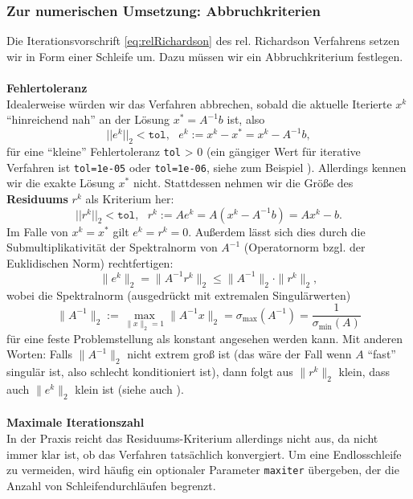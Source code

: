 \subsubsection{Zur numerischen Umsetzung: Abbruchkriterien}
Die Iterationsvorschrift \eqref{eq:relRichardson} des rel. Richardson Verfahrens setzen wir in Form einer Schleife um. Dazu müssen wir ein Abbruchkriterium festlegen.\\~\\
\textbf{Fehlertoleranz}\\
Idealerweise würden wir das Verfahren abbrechen, sobald die aktuelle Iterierte $x^k$ ``hinreichend nah'' an der Lösung $x^* = A^{-1}b$ ist, also
$$||e^k||_2 < \texttt{tol},~~~ e^k:= x^k - x^* = x^k - A^{-1}b,$$
für eine ``kleine'' Fehlertoleranz \texttt{tol} > 0 (ein gängiger Wert für iterative Verfahren ist \texttt{tol=1e-05} oder \texttt{tol=1e-06}, siehe zum Beispiel ). Allerdings kennen wir die exakte Lösung $x^*$ nicht. Stattdessen nehmen wir die Größe des \textbf{Residuums} $r^k$ als Kriterium her:
$$||r^k||_2 < \texttt{tol},~~~ r^k:= Ae^k= A(x^k - A^{-1}b)= Ax^k -b.$$
Im Falle von $x^k = x^*$ gilt $e^k = r^k = 0$. Außerdem lässt sich dies durch die Submultiplikativität der Spektralnorm von $A^{-1}$ (Operatornorm bzgl. der Euklidischen Norm) rechtfertigen:
$$\|e^k\|_2 = \|A^{-1}r^k\|_2  \leq   \|A^{-1}\|_2 \cdot \|r^k\|_2,$$
wobei die Spektralnorm (ausgedrückt mit extremalen Singulärwerten) $$\|A^{-1}\|_2 := \max_{\|x\|_2 = 1} \|A^{-1}x\|_2 = \sigma_{\text{max}}(A^{-1})= \frac{1}{\sigma_{\text{min}}(A)}$$ für eine feste Problemstellung als konstant angesehen werden kann. Mit anderen Worten: Falls $\|A^{-1}\|_2$ nicht extrem groß ist (das wäre der Fall wenn $A$ ``fast'' singulär ist, also schlecht konditioniert ist), dann folgt aus $\|r^k\|_2$ klein, dass auch $\|e^k\|_2$ klein ist (siehe auch \cite[Kap. 2.3]{Meister}).\\~\\
\textbf{Maximale Iterationszahl}\\
In der Praxis reicht das Residuums-Kriterium allerdings nicht aus, da nicht immer klar ist, ob das Verfahren tatsächlich konvergiert. Um eine Endlosschleife zu vermeiden, wird häufig ein optionaler Parameter \texttt{maxiter} übergeben, der die Anzahl von Schleifendurchläufen begrenzt.
%
